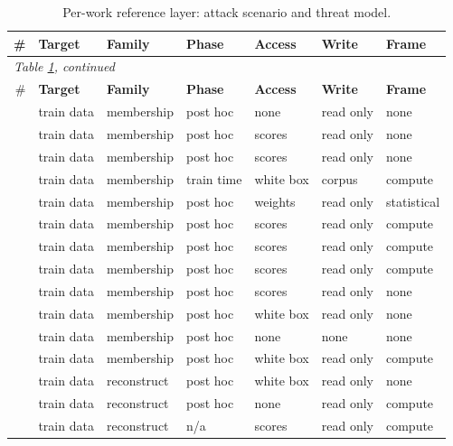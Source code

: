 \begin{landscape}
\begingroup\scriptsize\setlength{\tabcolsep}{4pt}
\begin{longtable}{rllllll}
\caption{Per-work reference layer: attack scenario and threat model.}\label{tab:scenario}\\
\toprule \# & \textbf{Target} & \textbf{Family} & \textbf{Phase} & \textbf{Access} & \textbf{Write} & \textbf{Frame} \\ \midrule\endfirsthead
\multicolumn{7}{l}{\emph{Table \ref{tab:scenario}, continued}}\\
\toprule \# & \textbf{Target} & \textbf{Family} & \textbf{Phase} & \textbf{Access} & \textbf{Write} & \textbf{Frame} \\ \midrule\endhead
\bottomrule\endfoot
\cite{DZT25} & train data & membership & post hoc & none & read only & none \\
\cite{RL21} & train data & membership & post hoc & scores & read only & none \\
\cite{DSMMSZTCEH24} & train data & membership & post hoc & scores & read only & none \\
\cite{VDKMR26} & train data & membership & train time & white box & corpus & compute \\
\cite{HSU25} & train data & membership & post hoc & weights & read only & statistical \\
\cite{SSSS17} & train data & membership & post hoc & scores & read only & compute \\
\cite{ZDKT25} & train data & membership & post hoc & scores & read only & compute \\
\cite{CCNSTT22} & train data & membership & post hoc & scores & read only & compute \\
\cite{AZT24} & train data & membership & post hoc & scores & read only & none \\
\cite{YGFJ18} & train data & membership & post hoc & white box & read only & none \\
\cite{MSJFRM25} & train data & membership & post hoc & none & none & none \\
\cite{GIKKM23} & train data & membership & post hoc & white box & read only & compute \\
\cite{CHSS24} & train data & reconstruct & post hoc & white box & read only & none \\
\cite{CKMMNST25} & train data & reconstruct & post hoc & none & read only & compute \\
\cite{DN03} & train data & reconstruct & n/a & scores & read only & compute \\

\end{longtable}
\end{landscape}
